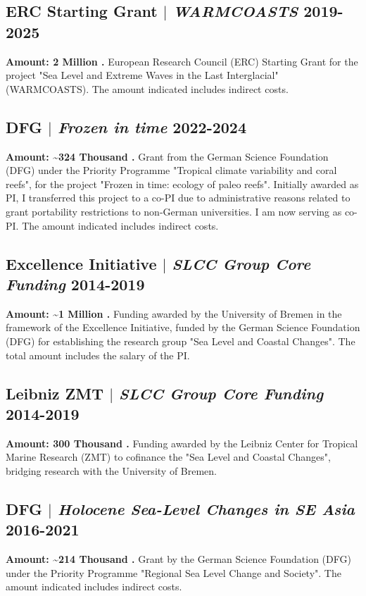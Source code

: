 \documentclass[11pt]{article}
\begin{document}
\bigskip

\subsection{ERC Starting Grant $|$ {\normalfont\textit{WARMCOASTS}} \hfill 2019-2025}
{\footnotesize \textbf{Amount: 2 Million \texteuro.} European Research Council (ERC) Starting Grant for the project "Sea Level and Extreme Waves in the Last Interglacial" (WARMCOASTS). The amount indicated includes indirect costs.}
\bigskip

\subsection{DFG $|$ {\normalfont\textit{Frozen in time}} \hfill 2022-2024}
{\footnotesize \textbf{Amount: \textasciitilde324 Thousand \texteuro.} Grant from the German Science Foundation (DFG) under the Priority Programme "Tropical climate variability and coral reefs", for the project "Frozen in time: ecology of paleo reefs". Initially awarded as PI, I transferred this project to a co-PI due to administrative reasons related to grant portability restrictions to non-German universities. I am now serving as co-PI. The amount indicated includes indirect costs.}
\bigskip

\subsection{Excellence Initiative $|$ {\normalfont\textit{SLCC Group Core Funding}} \hfill 2014-2019}
{\footnotesize \textbf{Amount: \textasciitilde1 Million \texteuro.} Funding awarded by the University of Bremen in the framework of the Excellence Initiative, funded by the German Science Foundation (DFG) for establishing the research group "Sea Level and Coastal Changes". The total amount includes the salary of the PI.}
\bigskip

\subsection{Leibniz ZMT $|$ {\normalfont\textit{SLCC Group Core Funding}} \hfill 2014-2019}
{\footnotesize \textbf{Amount: 300 Thousand \texteuro.} Funding awarded by the Leibniz Center for Tropical Marine Research (ZMT) to cofinance the "Sea Level and Coastal Changes", bridging research with the University of Bremen.}
\bigskip

\subsection{DFG $|$ {\normalfont\textit{Holocene Sea-Level Changes in SE Asia}} \hfill 2016-2021}
{\footnotesize \textbf{Amount: \textasciitilde214 Thousand \texteuro.} Grant by the German Science Foundation (DFG) under the Priority Programme "Regional Sea Level Change and Society". The amount indicated includes indirect costs.}
\bigskip
\end{document}
